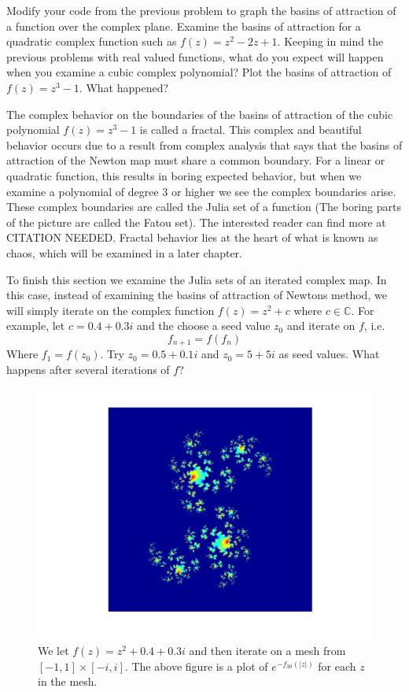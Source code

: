 \begin{problem}
Modify your code from the previous problem to graph the basins of attraction of a function over the complex plane.  Examine the basins of attraction for a quadratic complex function such as $f(z) = z^2 - 2z + 1$.  Keeping in mind the previous problems with real valued functions, what do you expect will happen when you examine a cubic complex polynomial?  Plot the basins of attraction of $f(z) = z^3 - 1$.  What happened?
\end{problem}

The complex behavior on the boundaries of the basins of attraction of the cubic polynomial $f(z) = z^3 - 1$ is called a fractal.  This complex and beautiful behavior occurs due to a result from complex analysis that says that the basins of attraction of the Newton map must share a common boundary.  For a linear or quadratic function, this results in boring expected behavior, but when we examine a polynomial of degree 3 or higher we see the complex boundaries arise.  These complex boundaries are called the Julia set of a function (The boring parts of the picture are called the Fatou set).  The interested reader can find more at CITATION NEEDED. Fractal behavior lies at the heart of what is known as chaos, which will be examined in a later chapter.

To finish this section we examine the Julia sets of an iterated complex map.  In this case, instead of examining the basins of attraction of Newtons method, we will simply iterate on the complex function $f(z) = z^2 + c$ where $c \in \mathbb{C}$.  For example, let $c = 0.4 + 0.3i$ and the choose a seed value $z_0$ and iterate on $f$, i.e.
\[
f_{n+1} = f(f_n)
\]
Where $f_1 = f(z_0)$.  Try $z_0 = 0.5 + 0.1i$ and $z_0 = 5 + 5i$ as seed values.  What happens after several iterations of $f$?

\begin{figure}\label{Fig:julia}
\begin{center}
\includegraphics[scale=0.5]{julia}
\caption{We let $f(z) = z^2 + 0.4 + 0.3i$ and then iterate on a mesh from $[-1,1]\times[-i,i]$.  The above figure is a plot of $e^{-f_{30}(|z|)}$ for each $z$ in the mesh.}
\end{center}
\end{figure}


